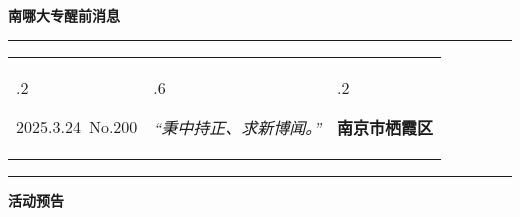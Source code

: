 \documentclass[letterpaper, 12pt]{article}
\begin{document}
\begin{center}
    \Huge\textbf{南哪大专醒前消息}
\end{center}
\vspace{4mm}
\hrule
\renewcommand\tabularxcolumn[1]{m{#1}}
\begin{tabularx}{\textwidth}{>{\hsize.2\hsize}X>{\hsize.6\hsize}X>{\hsize.2\hsize}X}
    \begin{flushleft}
        2025.3.24\, No.200
    \end{flushleft}
    &
    \begin{center}
        \textit{“秉中持正、求新博闻。”}
    \end{center}
    &
    \begin{flushright}
        \textbf{南京市栖霞区}
    \end{flushright}
\end{tabularx}
\vspace{-3.5mm}
\hrule
\vspace{4mm}
\centerline{\huge\textbf{活动预告}}
\end{document}
